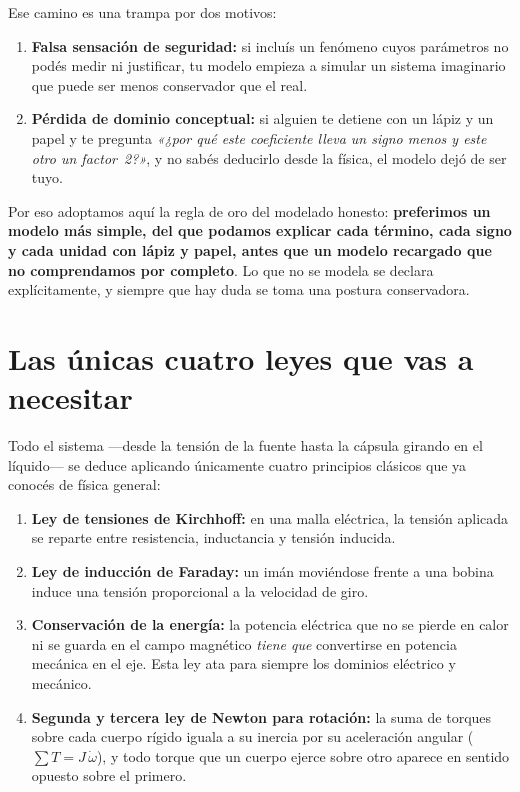 \documentclass[11pt,a4paper,oneside]{book}
\begin{document}
Ese camino es una trampa por dos motivos:
\begin{enumerate}
  \item \textbf{Falsa sensación de seguridad:} si incluís un fenómeno cuyos
        parámetros no podés medir ni justificar, tu modelo empieza a simular un
        sistema imaginario que puede ser menos conservador que el real.
  \item \textbf{Pérdida de dominio conceptual:} si alguien te detiene con un
        lápiz y un papel y te pregunta \emph{«¿por qué este coeficiente lleva un
        signo menos y este otro un factor~2?»}, y no sabés deducirlo desde la
        física, el modelo dejó de ser tuyo.
\end{enumerate}

Por eso adoptamos aquí la regla de oro del modelado honesto: \textbf{preferimos
un modelo más simple, del que podamos explicar cada término, cada signo y cada
unidad con lápiz y papel, antes que un modelo recargado que no comprendamos por
completo}. Lo que no se modela se declara explícitamente, y siempre que hay
duda se toma una postura conservadora.

\section*{Las únicas cuatro leyes que vas a necesitar}
Todo el sistema ---desde la tensión de la fuente hasta la cápsula girando en el
líquido--- se deduce aplicando únicamente cuatro principios clásicos que ya
conocés de física general:
\begin{enumerate}
  \item \textbf{Ley de tensiones de Kirchhoff:} en una malla eléctrica, la
        tensión aplicada se reparte entre resistencia, inductancia y tensión
        inducida.
  \item \textbf{Ley de inducción de Faraday:} un imán moviéndose frente a una
        bobina induce una tensión proporcional a la velocidad de giro.
  \item \textbf{Conservación de la energía:} la potencia eléctrica que no se
        pierde en calor ni se guarda en el campo magnético \emph{tiene que}
        convertirse en potencia mecánica en el eje. Esta ley ata para siempre
        los dominios eléctrico y mecánico.
  \item \textbf{Segunda y tercera ley de Newton para rotación:} la suma de
        torques sobre cada cuerpo rígido iguala a su inercia por su aceleración
        angular ($\sum T = J\,\dot\omega$), y todo torque que un cuerpo ejerce
        sobre otro aparece en sentido opuesto sobre el primero.
\end{enumerate}
\end{document}
